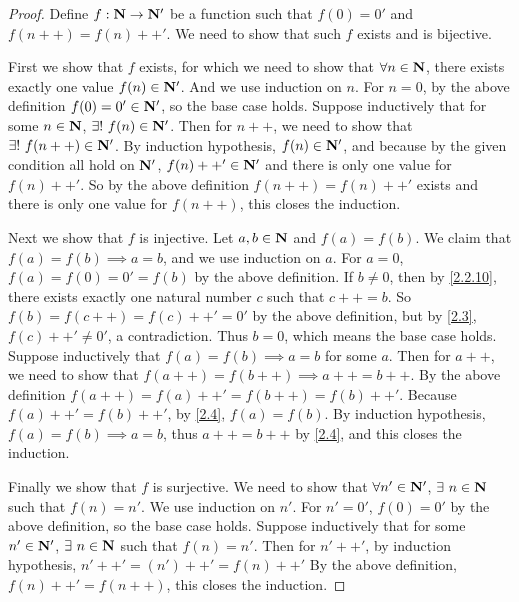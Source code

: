 \begin{proof}
  Define \(f : \mathbf{N} \to \mathbf{N}'\) be a function such that \(f(0) = 0'\) and \(f(n++) = f(n)++'\).
  We need to show that such \(f\) exists and is bijective.

  First we show that \(f\) exists, for which we need to show that \(\forall n \in \mathbf{N}\), there exists exactly one value \(f(n) \in \mathbf{N}'\).
  And we use induction on \(n\).
  For \(n = 0\), by the above definition \(f(0) = 0' \in \mathbf{N}'\), so the base case holds.
  Suppose inductively that for some \(n \in \mathbf{N}\), \(\exists!\ f(n) \in \mathbf{N}'\).
  Then for \(n++\), we need to show that \(\exists!\ f(n++) \in \mathbf{N}'\).
  By induction hypothesis, \(f(n) \in \mathbf{N}'\), and because by the given condition  all hold on \(\mathbf{N}'\), \(f(n)++' \in \mathbf{N}'\) and there is only one value for \(f(n)++'\).
  So by the above definition \(f(n++) = f(n)++'\) exists and there is only one value for \(f(n++)\), this closes the induction.

  Next we show that \(f\) is injective.
  Let \(a, b \in \mathbf{N}\) and \(f(a) = f(b)\).
  We claim that \(f(a) = f(b) \implies a = b\), and we use induction on \(a\).
  For \(a = 0\), \(f(a) = f(0) = 0' = f(b)\) by the above definition.
  If \(b \neq 0\), then by \cref{2.2.10}, there exists exactly one natural number \(c\) such that \(c++ = b\).
  So \(f(b) = f(c++) = f(c)++' = 0'\) by the above definition, but by \cref{2.3}, \(f(c)++' \neq 0'\), a contradiction.
  Thus \(b = 0\), which means the base case holds.
  Suppose inductively that \(f(a) = f(b) \implies a = b\) for some \(a\).
  Then for \(a++\), we need to show that \(f(a++) = f(b++) \implies a++ = b++\).
  By the above definition \(f(a++) = f(a)++' = f(b++) = f(b)++'\).
  Because \(f(a)++' = f(b)++'\), by \cref{2.4}, \(f(a) = f(b)\).
  By induction hypothesis, \(f(a) = f(b) \implies a = b\), thus \(a++ = b++\) by \cref{2.4}, and this closes the induction.

  Finally we show that \(f\) is surjective.
  We need to show that \(\forall n' \in \mathbf{N}'\), \(\exists\ n \in \mathbf{N}\) such that \(f(n) = n'\).
  We use induction on \(n'\).
  For \(n' = 0'\), \(f(0) = 0'\) by the above definition, so the base case holds.
  Suppose inductively that for some \(n' \in \mathbf{N}'\), \(\exists\ n \in \mathbf{N}\) such that \(f(n) = n'\).
  Then for \(n'++'\), by induction hypothesis, \(n'++' = (n')++' = f(n)++'\)
  By the above definition, \(f(n)++' = f(n++)\), this closes the induction.
\end{proof}